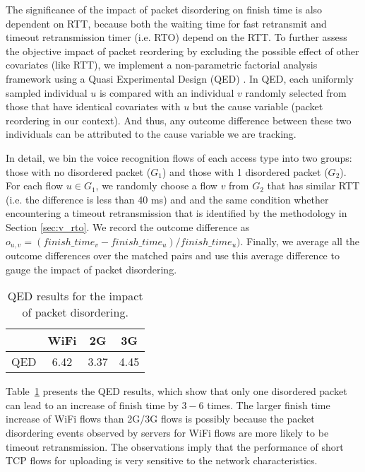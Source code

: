The significance of the impact of packet disordering on finish time is also dependent on RTT, because both the waiting time for fast retransmit and timeout retransmission timer (i.e. RTO) depend on the RTT. To further assess the objective impact of packet reordering by excluding the possible effect of other covariates (like RTT), we implement a non-parametric factorial analysis framework using a Quasi Experimental Design (QED) \cite{krishnan2013video}. In QED, each uniformly sampled individual $u$ is compared with an individual $v$ randomly selected from those that have identical covariates with $u$ but the cause variable (packet reordering in our context). And thus, any outcome difference between these two individuals can be attributed to the cause variable we are tracking. 

In detail, we bin the voice recognition flows of each access type into two groups: those with no disordered packet ($G_1$) and those with 1 disordered packet ($G_2$). For each flow $u \in G_1$, we randomly choose a flow $v$ from $G_2$ that has similar RTT (i.e. the difference is less than 40 ms) and and the same condition whether encountering a timeout retransmission that is identified by the methodology in Section \ref{sec:v_rto}. We record the outcome difference as $o_{u,v} = (finish\_time_{v} - finish\_time_{u}) / finish\_time_{u})$. Finally, we average all the outcome differences over the matched pairs and use this average difference to gauge the impact of packet disordering.

\begin{table}[th]
\caption{QED results for the impact of packet disordering.}
\label{tab:voice_qed_reorder}
\centering
\renewcommand{\arraystretch}{1.1}
\begin{tabular}{c|c|c|c}
	\toprule
	 & WiFi & 2G & 3G \\
	\midrule
	QED & 6.42 & 3.37 & 4.45 \\
	\bottomrule
\end{tabular}
\end{table}

Table~\ref{tab:voice_qed_reorder} presents the QED results, which show that only one disordered packet can lead to an increase of finish time by $3-6$ times. The larger finish time increase of WiFi flows than 2G/3G flows is possibly because the packet disordering events observed by servers for WiFi flows are more likely to be timeout retransmission. The observations imply that the performance of short TCP flows for uploading is very sensitive to the network characteristics. 

